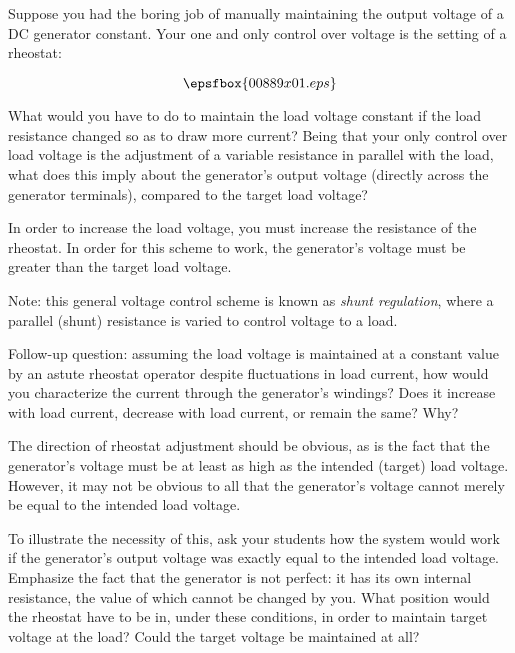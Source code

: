 

Suppose you had the boring job of manually maintaining the output voltage of a DC generator constant.  Your one and only control over voltage is the setting of a rheostat:

$$\epsfbox{00889x01.eps}$$

What would you have to do to maintain the load voltage constant if the load resistance changed so as to draw more current?  Being that your only control over load voltage is the adjustment of a variable resistance in parallel with the load, what does this imply about the generator's output voltage (directly across the generator terminals), compared to the target load voltage?







In order to increase the load voltage, you must increase the resistance of the rheostat.  In order for this scheme to work, the generator's voltage must be greater than the target load voltage.

Note: this general voltage control scheme is known as {\it shunt regulation}, where a parallel (shunt) resistance is varied to control voltage to a load.

\vskip 10pt

Follow-up question: assuming the load voltage is maintained at a constant value by an astute rheostat operator despite fluctuations in load current, how would you characterize the current through the generator's windings?  Does it increase with load current, decrease with load current, or remain the same?  Why?







The direction of rheostat adjustment should be obvious, as is the fact that the generator's voltage must be at least as high as the intended (target) load voltage.  However, it may not be obvious to all that the generator's voltage cannot merely be equal to the intended load voltage.

To illustrate the necessity of this, ask your students how the system would work if the generator's output voltage was exactly equal to the intended load voltage.  Emphasize the fact that the generator is not perfect: it has its own internal resistance, the value of which cannot be changed by you.  What position would the rheostat have to be in, under these conditions, in order to maintain target voltage at the load?  Could the target voltage be maintained at all?

